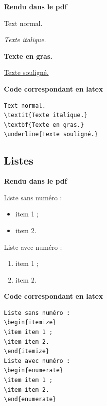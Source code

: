 \documentclass[12pt]{report}
\begin{document}
\begin{minipage}[t]{.45\linewidth}
\textbf{Rendu dans le pdf}
\vspace{.5cm}

Text normal.

\textit{Texte italique.}

\textbf{Texte en gras.}

\underline{Texte souligné.}


\end{minipage}\hfill\vrule\hfill
\begin{minipage}[t]{.45\linewidth}
\textbf{Code correspondant en latex}

\begin{verbatim}
Text normal.
\textit{Texte italique.}
\textbf{Texte en gras.}
\underline{Texte souligné.}

\end{verbatim}
\end{minipage}
\subsection{Listes}


\begin{minipage}[t]{.45\linewidth}
\textbf{Rendu dans le pdf}
\vspace{.5cm}

Liste sans numéro :
\begin{itemize}
\item item 1 ;
\item item 2.
\end{itemize}
Liste avec numéro :
\begin{enumerate}
\item item 1 ;
\item item 2.
\end{enumerate}

\end{minipage}\hfill\vrule\hfill
\begin{minipage}[t]{.45\linewidth}
\textbf{Code correspondant en latex}

\begin{verbatim}
Liste sans numéro :
\begin{itemize}
\item item 1 ;
\item item 2.
\end{itemize}
Liste avec numéro :
\begin{enumerate}
\item item 1 ;
\item item 2.
\end{enumerate}
\end{verbatim}
\end{minipage}
\end{document}
